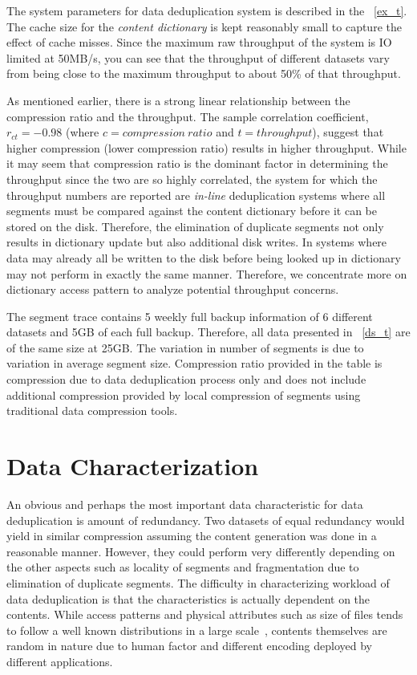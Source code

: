 The system parameters for data deduplication system is described in the \tablename~\ref{ex_t}. The cache size for the \emph{content dictionary} is kept reasonably small to capture the effect of cache misses. Since the maximum raw throughput of the system is IO limited at 50MB/s, you can see that the throughput of different datasets vary from being close to the maximum throughput to about 50\% of that throughput. 

As mentioned earlier, there is a strong linear relationship between the compression ratio and the throughput. The sample correlation coefficient, $r_{ct} = -0.98$ (where $c=compression\ ratio$ and $t=throughput$), suggest that higher compression (lower compression ratio) results in higher throughput. While it may seem that compression ratio is the dominant factor in determining the throughput since the two are so highly correlated, the system for which the throughput numbers are reported are \emph{in-line} deduplication systems where all segments must be compared against the content dictionary before it can be stored on the disk. Therefore, the elimination of duplicate segments not only results in dictionary update but also additional disk writes. In systems where data may already all be written to the disk before being looked up in dictionary may not perform in exactly the same manner. Therefore, we concentrate more on dictionary access pattern to analyze potential throughput concerns.

The segment trace contains 5 weekly full backup information of 6 different datasets and 5GB of each full backup. Therefore, all data presented in \tablename~\ref{ds_t} are of the same size at 25GB. The variation in number of segments is due to variation in average segment size. Compression ratio provided in the table is compression due to data deduplication process only and does not include additional compression provided by local compression of segments using traditional data compression tools. 



\section{Data Characterization}\label{result}

An obvious and perhaps the most important data characteristic for data deduplication is amount of redundancy. Two datasets of equal redundancy would yield in similar compression assuming the content generation was done in a reasonable manner. However, they could perform very differently depending on the other aspects such as locality of segments and fragmentation due to elimination of duplicate segments. The difficulty in characterizing workload of data deduplication is that the characteristics is actually dependent on the contents. While access patterns and physical attributes such as size of files tends to follow a well known distributions in a large scale~\cite{riska:2009, leung:2008}, contents themselves are random in nature due to human factor and different encoding deployed by different applications.

